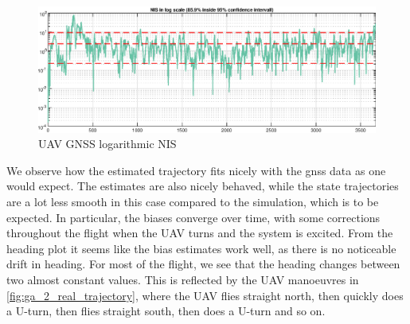 \begin{figure}[!htb]
    \centering
    \includegraphics[width=0.7\linewidth]{figures/ga_2/real_consistency.eps}
    \caption{UAV GNSS logarithmic NIS}
    \label{fig:ga_2_real_consistency}
\end{figure}

We observe how the estimated trajectory fits nicely with the \acrshort{gnss} data as one would expect. The estimates are also nicely behaved, while the state trajectories are a lot less smooth in this case compared to the simulation, which is to be expected. In particular, the biases converge over time, with some corrections throughout the flight when the UAV turns and the system is excited. From the heading plot it seems like the bias estimates work well, as there is no noticeable drift in heading. For most of the flight, we see that the heading changes between two almost constant values. This is reflected by the UAV manoeuvres in \cref{fig:ga_2_real_trajectory}, where the UAV flies straight north, then quickly does a U-turn, then flies straight south, then does a U-turn and so on. 

